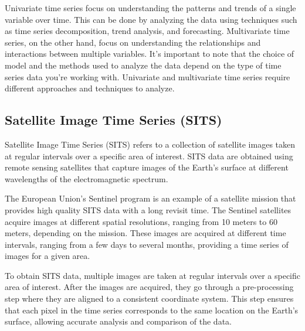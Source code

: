 Univariate time series focus on understanding the patterns and trends of a single variable over time. This can be done by analyzing the data using techniques such as time series decomposition, trend analysis, and forecasting.
Multivariate time series, on the other hand, focus on understanding the relationships and interactions between multiple variables. 
It's important to note that the choice of model and the methods used to analyze the data depend on the type of time series data you're working with. Univariate and multivariate time series require different approaches and techniques to analyze.

\subsection{Satellite Image Time Series (SITS)}

Satellite Image Time Series (SITS) refers to a collection of satellite images taken at regular intervals over a specific area of interest. 
SITS data are obtained using remote sensing satellites that capture images of the Earth's surface at different wavelengths of the electromagnetic spectrum.

The European Union's Sentinel program is an example of a satellite mission that provides high quality SITS data with a long revisit time.
The Sentinel satellites acquire images at different spatial resolutions, ranging from 10 meters to 60 meters, depending on the mission. 
These images are acquired at different time intervals, ranging from a few days to several months, providing a time series of images for a given area.

To obtain SITS data, multiple images are taken at regular intervals over a specific area of interest. 
After the images are acquired, they go through a pre-processing step where they are aligned to a consistent coordinate system. 
This step ensures that each pixel in the time series corresponds to the same location on the Earth's surface, allowing accurate analysis and comparison of the data.


